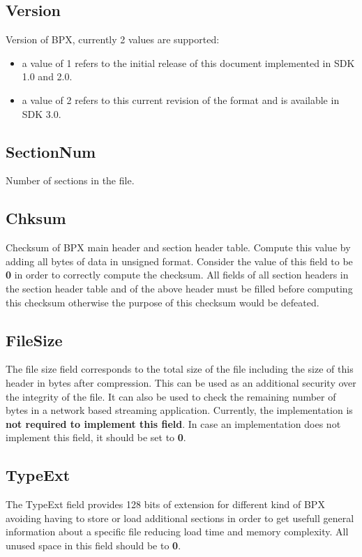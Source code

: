 \subsection{Version}
Version of BPX, currently 2 values are supported:
\begin{itemize}
	\item a value of 1 refers to the initial release of this document implemented in SDK 1.0 and 2.0.
	\item a value of 2 refers to this current revision of the format and is available in SDK 3.0.
\end{itemize}

\subsection{SectionNum}
Number of sections in the file.

\subsection{Chksum}
Checksum of BPX main header and section header table. Compute this value by adding all bytes of data in unsigned format. Consider the value of this field to be \textbf{0} in order to correctly compute the checksum.\newline
All fields of all section headers in the section header table and of the above header must be filled before computing this checksum otherwise the purpose of this checksum would be defeated.

\subsection{FileSize}
The file size field corresponds to the total size of the file including the size of this header in bytes after compression.\newline
This can be used as an additional security over the integrity of the file. It can also be used to check the remaining number of bytes in a network based streaming application.\newline
Currently, the implementation is \textbf{not required to implement this field}. In case an implementation does not implement this field, it should be set to \textbf{0}.

\subsection{TypeExt}
The TypeExt field provides 128 bits of extension for different kind of BPX avoiding having to store or load additional sections in order to get usefull general information about a specific file reducing load time and memory complexity.\newline
All unused space in this field should be to \textbf{0}.
